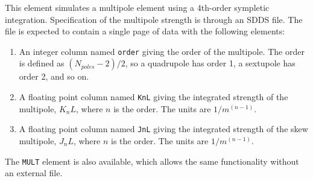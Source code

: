 \begin{raggedright}
This element simulates a multipole element using a 4th-order sympletic
integration.  
Specification of the multipole strength is through an SDDS file.
The file is expected to contain a single page of
data with the following elements:
\end{raggedright}
\begin{enumerate}
\item An integer column named {\tt order} giving the order of the multipole.
The order is defined as $(N_{poles}-2)/2$, so a quadrupole has order 1, a
sextupole has order 2, and so on.
\item A floating point column named {\tt KnL} giving the integrated strength of
the multipole, $K_n L$, where $n$ is the order.  The units are $1/m^(n-1)$.
\item A floating point column named {\tt JnL} giving the integrated strength of
the skew multipole, $J_n L$, where $n$ is the order.  The units are $1/m^(n-1)$.
\end{enumerate}

The {\tt MULT} element is also available, which allows the same
functionality without an external file.
